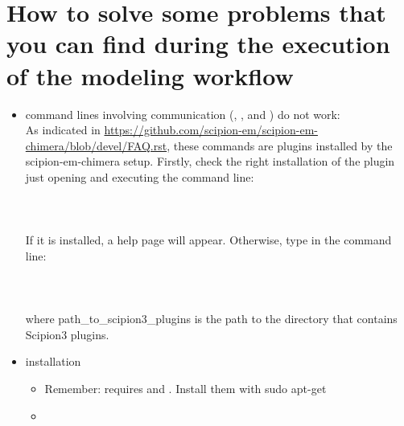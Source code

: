 \section{How to solve some problems that you can find during the execution of the modeling workflow}
\label{problems}

\begin{itemize}
 
 \item \chimera command lines involving \scipion communication (, ,  and ) do not work:\\
 As indicated in \url{https://github.com/scipion-em/scipion-em-chimera/blob/devel/FAQ.rst}, these commands are \chimerax plugins installed by the scipion-em-chimera setup. Firstly, check the right installation of the plugin just opening \chimera and executing the command line:\\ 
 \\ \\ 
 \\If it is installed, a help page will appear. Otherwise, type in the command line:\\ \\ \\ 
 \\where path\_to\_scipion3\_plugins is the path to the directory that contains Scipion3 plugins.

 \item {} installation
        \begin{itemize}
        \item Remember:  requires  and . Install them with sudo apt-get
        \item 
        \end{itemize}

 
\end{itemize}
